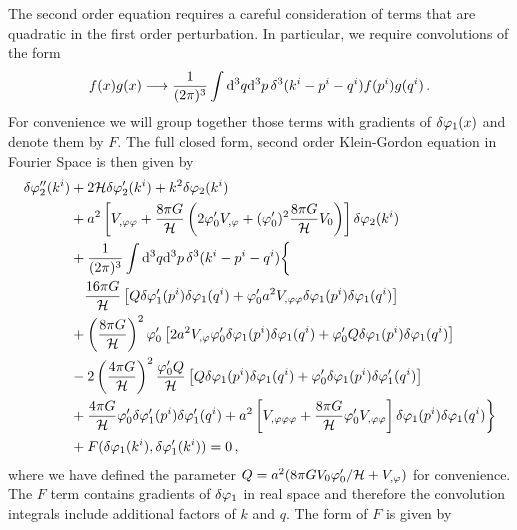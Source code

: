 The second order equation requires a careful
consideration of terms that are quadratic in the first order perturbation. In
particular, we
require convolutions of the form
%
\begin{equation}
 f(x)g(x) \longrightarrow \frac{1}{(2 \pi)^3} \int \mathrm{d}^3q \mathrm{d}^3p\, \delta^3(k^i
-p^i -q^i) f(p^i)
g(q^i) \,.
\end{equation}
%
For convenience we will group together those terms with gradients of $\delta\varphi_{1}(x)$
and denote them by $F$. 
The full closed form, second order Klein-Gordon
equation in Fourier Space is then given by \cite{Malik:2006ir}
%  
\begin{align}
\label{eq:SOKG-real-num}
\dvp2''(\kvi) &+ 2\H \dvp2'(\kvi) + k^2 \dvp2(\kvi) \nonumber \\
%
&+ a^2\left[\Upp + \frac{8\pi G}{\H}\left(2\vp_{0}'\Uphi
+ (\vp_0')^2\frac{8\pi G}{\H}\U \right) \right]\dvp2(\kvi) \nonumber \\
% 
&+ \frac{1}{(2\pi)^3}\int \d^3q \d^3p\, \delta^3(\kvi -\pvi -\qvi) \biggl\{
\biggr.\nonumber\\
&\quad \frac{16\pi G}{\H} \left[ Q \dvp1'(\pvi) \dvp1(\qvi) + \vp_{0}' a^2\Upp
\dvp1(\pvi)\dvp1(\qvi) \right]  \nonumber \\
%
&+ \left(\frac{8\pi G}{\H}\right)^2\vp_{0}'\left[2a^2\Uphi\vp_{0}'
\dvp1(\pvi)\dvp1(\qvi) + \vp_{0}'Q\dvp1(\pvi)\dvp1(\qvi) \right]
\nonumber \\
%
&- 2\left(\frac{4\pi G}{\H}\right)^2\frac{\vp_{0}' Q}{\H} \left[Q\dvp1(\pvi)
\dvp1(\qvi) +
\vp_{0}' \dvp1(\pvi) \dvp1'(\qvi)\right] \nonumber \\
%
\biggl. &+ \frac{4\pi G}{\H} \vp_{0}' \dvp1'(\pvi) \dvp1'(\qvi) 
 + a^2\left[\Uppp + \frac{8\pi G}{\H}\vp_{0}' \Upp\right] \dvp1(\pvi)
\dvp1(\qvi) \biggr\} \nonumber \\
&+ F(\dvp1(\kvi), \dvp1'(\kvi)) = 0\,,
\end{align}
%
where we have defined the parameter $Q=a^2 (8\pi G V_{0} \varphi_0'/\mathcal{H} + V_{,\varphi})$ for
convenience.
The $F$ term contains gradients of $\delta\varphi_{1}$ in real space and therefore
the convolution integrals include additional factors of $k$ and
$q$. The form of $F$ is given by \cite{Malik:2006ir}
%
